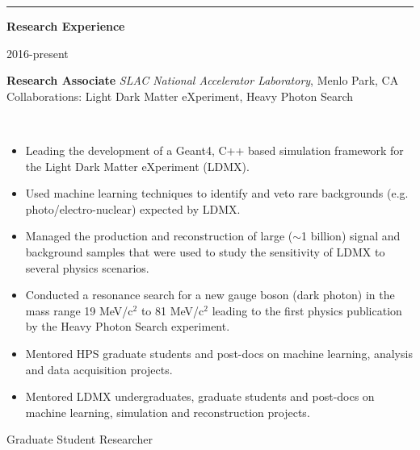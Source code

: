 \documentclass[11pt]{article}
\newcommand{\cvsection}[1] {
    \noindent
    \textcolor{indigodye}{\rule{.15\textwidth}{.1in} \hspace{0.01 \textwidth} \textbf{\Large{#1}}} \newline 
}
\newcommand{\experienceentrycollab}[6] { 
    \noindent
    \begin{minipage}[t]{0.15\textwidth} \begin{flushright} #1 \end{flushright} \end{minipage} \hspace{0.01\textwidth}
    \begin{minipage}[t]{0.84\textwidth} 
        \textbf{#2} \newline
        \emph{#3}, #4 \newline
        Collaborations: #5
    \end{minipage} \\[0.01pt]
    #6 \vspace{11pt}
}
\begin{document}
    \cvsection{Research Experience}
        \experienceentrycollab{2016-present}
                        {Research Associate}
                        {SLAC National Accelerator Laboratory}
                        {Menlo Park, CA}
                        {Light Dark Matter eXperiment, Heavy Photon Search}
                        {   
                            \begin{itemize}[label=\textcolor{indigodye}{$\circ$}, noitemsep, nolistsep, leftmargin=0.19\textwidth]
                                \item Leading the development of a Geant4, C++ based simulation framework for the Light Dark
                                      Matter eXperiment (LDMX).
                                \item Used machine learning techniques to identify and veto rare backgrounds (e.g.
                                      photo/electro-nuclear) expected by LDMX.
                                \item Managed the production and reconstruction of large ($\sim$1 billion) signal and background samples that were used to study the sensitivity of LDMX to several physics scenarios. 
                                \item Conducted a resonance search for a new gauge boson (dark photon) in the mass range 
                                      19 MeV/c$^2$ to 81 MeV/c$^2$ leading to the first physics publication by the
                                      Heavy Photon Search experiment.
                                \item Mentored HPS graduate students and post-docs on machine learning, 
                                      analysis and data acquisition projects.
                                \item Mentored LDMX undergraduates, graduate students and post-docs on 
                                      machine learning, simulation and reconstruction projects.
                            \end{itemize} 
                        } 
                        {Graduate Student Researcher}
\end{document}

